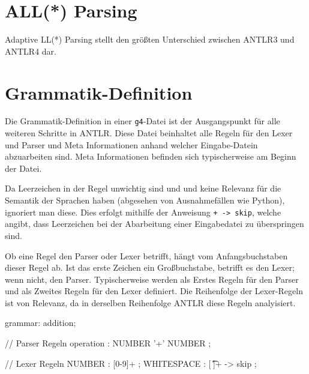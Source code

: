 
\section{ALL(*) Parsing}

Adaptive LL(*) Parsing stellt den größten Unterschied zwischen ANTLR3 und ANTLR4 dar.

\section{Grammatik-Definition}

Die Grammatik-Definition in einer \texttt{g4}-Datei ist der Ausgangspunkt für alle weiteren Schritte in ANTLR. Diese Datei beinhaltet alle Regeln für den Lexer und Parser und Meta Informationen anhand welcher Eingabe-Datein abzuarbeiten sind. Meta Informationen befinden sich typischerweise am Beginn der Datei.

Da Leerzeichen in der Regel unwichtig sind und und keine Relevanz für die Semantik der Sprachen haben (abgesehen von Ausnahmefällen wie Python), ignoriert man diese. Dies erfolgt mithilfe der Anweisung \texttt{+ -> skip}, welche angibt, dass Leerzeichen bei der Abarbeitung einer Eingabedatei zu überspringen sind.

Ob eine Regel den Parser oder Lexer betrifft, hängt vom Anfangsbuchstaben dieser Regel ab. Ist das erste Zeichen ein Großbuchstabe, betrifft es den Lexer; wenn nicht, den Parser. Typischerweise werden als Erstes Regeln für den Parser und als Zweites Regeln für den Lexer definiert. Die Reihenfolge der Lexer-Regeln ist von Relevanz, da in derselben Reihenfolge ANTLR diese Regeln analyisiert.

\begin{AntlrCode}[numbers=none, caption={Beispielhafter Aufbau einer Grammatik-Definition für Additionen}]
grammar: addition;

// Parser Regeln
operation  : NUMBER '+' NUMBER ;

// Lexer Regeln
NUMBER     : [0-9]+ ;
WHITESPACE : [ \t\n\r]+ -> skip ;
\end{AntlrCode}

